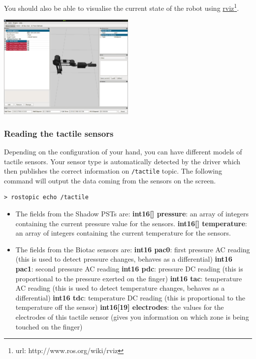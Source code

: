 \documentclass[12pt]{article}
\newcommand{\betterhref}[2]{\href{#1}{#2}\footnote{url: #1}}
\begin{document}
\par You should also be able to visualise the current state of the robot using \betterhref{http://www.ros.org/wiki/rviz}{rviz}.
\begin{center}
\includegraphics[width=0.5\textwidth]{images/rviz.png}
\end{center}

\subsubsection{Reading the tactile sensors}
\par Depending on the configuration of your hand, you can have different models of tactile sensors. Your sensor type is automatically detected by the driver which then publishes the correct information on \texttt{/tactile} topic. The following command will output the data coming from the sensors on the screen.
  \begin{lstlisting}[escapeinside='']
> rostopic echo /tactile
  \end{lstlisting}

\begin{itemize}
\item The fields from the Shadow PSTs are:
  \subitem \textbf{int16[] pressure}: an array of integers containing the current pressure value for the sensors.
  \subitem \textbf{int16[] temperature}: an array of integers containing the current temperature for the sensors.

\item The fields from the Biotac sensors are:
  \subitem \textbf{int16 pac0}: first pressure AC reading (this is used to detect pressure changes, behaves as a differential)
  \subitem \textbf{int16 pac1}: second pressure AC reading
  \subitem \textbf{int16 pdc}: pressure DC reading (this is proportional to the pressure exerted on the finger)
  \subitem \textbf{int16 tac}: temperature AC reading (this is used to detect temperature changes, behaves as a differential)
  \subitem \textbf{int16 tdc}: temperature DC reading (this is proportional to the temperature off the sensor)
  \subitem \textbf{int16[19] electrodes}: the values for the electrodes of this tactile sensor (gives you information on which zone is being touched on the finger)
\end{itemize}
\end{document}

